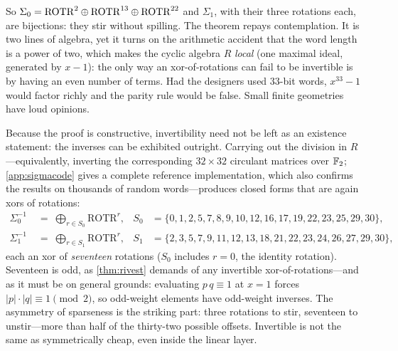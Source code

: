 So $\Sigma_0 = \mathrm{ROTR}^{2} \oplus \mathrm{ROTR}^{13} \oplus
\mathrm{ROTR}^{22}$ and $\Sigma_1$, with their three rotations each, are
bijections: they stir without spilling. The theorem repays contemplation.
It is two lines of algebra, yet it turns on the arithmetic accident that
the word length is a power of two, which makes the cyclic algebra $R$
\emph{local} (one maximal ideal, generated by $x-1$): the only way an
xor-of-rotations can fail to be invertible is by having an even number of
terms. Had the designers used $33$-bit words, $x^{33}-1$ would factor
richly and the parity rule would be false. Small finite geometries have
loud opinions.

Because the proof is constructive, invertibility need not be left as an
existence statement: the inverses can be exhibited outright. Carrying out
the division in $R$---equivalently, inverting the corresponding
$32\times32$ circulant matrices over $\mathbb{F}_2$; \cref{app:sigmacode} gives
a complete reference implementation, which also confirms the results on
thousands of random words---produces closed forms that are again xors of
rotations:
\begin{equation}\label{eq:sigmainv}
\begin{aligned}
  \Sigma_0^{-1} \;&=\; \bigoplus_{r \in S_0} \mathrm{ROTR}^{r},
  & S_0 &= \{0,1,2,5,7,8,9,10,12,16,17,19,22,23,25,29,30\},\\
  \Sigma_1^{-1} \;&=\; \bigoplus_{r \in S_1} \mathrm{ROTR}^{r},
  & S_1 &= \{2,3,5,7,9,11,12,13,18,21,22,23,24,26,27,29,30\},
\end{aligned}
\end{equation}
each an xor of \emph{seventeen} rotations ($S_0$ includes $r = 0$, the
identity rotation). Seventeen is odd, as \cref{thm:rivest} demands of any
invertible xor-of-rotations---and as it must be on general grounds:
evaluating $p\,q \equiv 1$ at $x = 1$ forces
$|p| \cdot |q| \equiv 1 \pmod 2$, so odd-weight elements have odd-weight
inverses. The asymmetry of sparseness is the striking part: three
rotations to stir, seventeen to unstir---more than half of the
thirty-two possible offsets. Invertible is not the same as symmetrically
cheap, even inside the linear layer.

